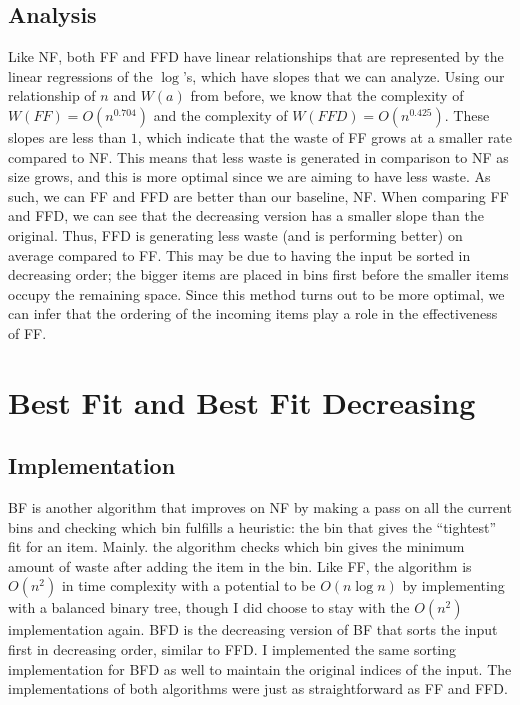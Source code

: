 \documentclass{article}
\begin{document}
\subsection{Analysis}
    Like NF, both FF and FFD have linear relationships that are represented by 
    the linear regressions of the $\log$'s, which have slopes that we can 
    analyze. Using our relationship of $n$ and $W(a)$ from before, we know that
    the complexity of $W(FF) = O\left( n^{0.704} \right)$ and the complexity of 
    $W(FFD) = O\left( n^{0.425} \right)$. These slopes are less than $1$, which
    indicate that the waste of FF grows at a smaller rate compared to NF. This 
    means that less waste is generated in comparison to NF as size grows, and 
    this is more optimal since we are aiming to have less waste. As such, we can
    FF and FFD are better than our baseline, NF.
    \nextblurb
    When comparing FF and FFD, we can see that the decreasing version has a
    smaller slope than the original. Thus, FFD is generating less waste (and is
    performing better) on average compared to FF. This may be due to having the
    input be sorted in decreasing order; the bigger items are placed in bins 
    first before the smaller items occupy the remaining space. Since this method
    turns out to be more optimal, we can infer that the ordering of the incoming
    items play a role in the effectiveness of FF.

\section{Best Fit and Best Fit Decreasing}
\subsection{Implementation}
    BF is another algorithm that improves on NF by making a pass on all the 
    current bins and checking which bin fulfills a heuristic: the bin that gives
    the ``tightest'' fit for an item. Mainly. the algorithm checks which bin
    gives the minimum amount of waste after adding the item in the bin. Like FF,
    the algorithm is $O(n^2)$ in time complexity with a potential to be
    $O(n \log{n})$ by implementing with a balanced binary tree, though I did
    choose to stay with the $O(n^2)$ implementation again.
    \nextblurb
    BFD is the decreasing version of BF that sorts the input first in decreasing
    order, similar to FFD. I implemented the same sorting implementation for BFD 
    as well to maintain the original indices of the input. The implementations
    of both algorithms were just as straightforward as FF and FFD.
\end{document}
